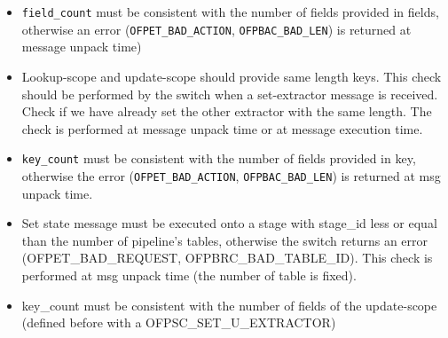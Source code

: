 \begin{itemize}
\item \texttt{field\_count} must be consistent with the number of fields provided in fields, otherwise an error (\texttt{OFPET\_BAD\_ACTION}, \texttt{OFPBAC\_BAD\_LEN}) is returned at message unpack time)

\item Lookup-scope and update-scope should provide same length keys. This check should be performed by the switch when a set-extractor message is received. Check if we have already set the other extractor with the same length. The check is performed at message unpack time or at message execution time. 

\item \texttt{key\_count} must be consistent with the number of fields provided in key, otherwise the error (\texttt{OFPET\_BAD\_ACTION}, \texttt{OFPBAC\_BAD\_LEN}) is returned at msg unpack time. 

\item Set state message must be executed onto a stage with stage\_id less or equal than the number of pipeline’s tables, otherwise the switch returns an error (OFPET\_BAD\_REQUEST, OFPBRC\_BAD\_TABLE\_ID). This check is performed at msg unpack time (the number of table is fixed).

\item key\_count must be consistent with the number of fields of the update-scope (defined before with a OFPSC\_SET\_U\_EXTRACTOR)

\end{itemize}